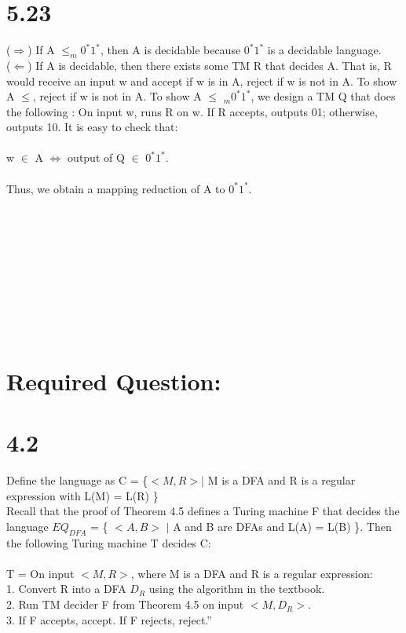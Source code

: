 \documentclass{scrartcl}
\begin{document}
\section*{5.23}
($\Rightarrow$) If A $\leq _m0^*1^*$, then A is decidable because $0^*1^*$ is a decidable language.\\
($\Leftarrow$) If A is decidable, then there exists some TM R that decides A. That is, R would receive an input w and accept if w is in A, reject if w is not in A. To show A $\leq$, reject if w is not in A. To show A $\leq$ $_m0^*1^*$, we design a TM Q that does the following : On input w, runs R on w. If R accepts, outputs 01; otherwise, outputs 10. It is easy to check that:\\
\\
w $\in$ A $\Leftrightarrow$ output of Q $\in$ $0^*1^*$.\\
\\
Thus, we obtain a mapping reduction of A to $0^*1^*$. 
\\
\\
\\
\\
\\
\\
\\
\\
\\
\\
\section*{Required Question:}
\section*{4.2}
Define the language as C = \{$<M,R>$$\mid$ M is a DFA and R is a regular expression with  L(M) = L(R)   \}\\
Recall that the proof of Theorem 4.5 defines a Turing machine F that decides the
language $EQ_{DFA}$ = \{ $<A, B>$ $\mid$ A and B are DFAs and L(A) = L(B) \}. Then the
following Turing machine T decides C:\\ \\
T = On input $<M, R>$, where M is a DFA and R is a regular expression:\\
1. Convert R into a DFA $D_R$ using the algorithm in the textbook.\\
2. Run TM decider F from Theorem 4.5 on input $<M, D_R>$.\\
3. If F accepts, accept. If F rejects, reject.”
\end{document}
